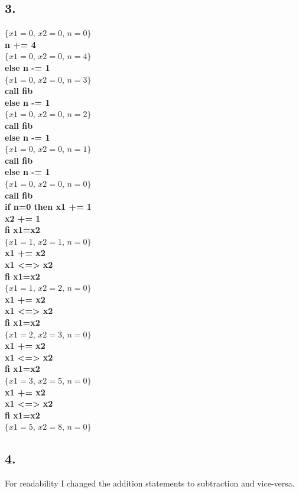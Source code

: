 \documentclass[12pt]{report}
\begin{document}
\subsection*{3.} 
$ \{x1=0$, $x2=0$, $n=0 \} $ \\
  \textbf{ n += 4 }\\
$ \{x1=0$, $x2=0$, $n=4 \} $ \\
  \textbf{else n -= 1} \\
$ \{x1=0$, $x2=0$, $n=3 \} $ \\
  \textbf{call fib} \\
 \textbf{else n -= 1} \\
$ \{x1=0$, $x2=0$, $n=2 \} $ \\
  \textbf{call fib} \\
  \textbf{else n -= 1} \\
$ \{x1=0$, $x2=0$, $n=1 \} $ \\
  \textbf{call fib} \\
  \textbf{else n -= 1} \\
$ \{x1=0$, $x2=0$, $n=0 \} $ \\
  \textbf{call fib} \\
  \textbf{if n=0 then x1 += 1} \\
  \textbf{x2 += 1} \\
  \textbf{fi x1=x2} \\
$ \{x1=1$, $x2=1$, $n=0 \} $ \\
  \textbf{x1 += x2} \\
  \textbf{x1 <=> x2} \\
  \textbf{fi x1=x2} \\
$ \{x1=1$, $x2=2$, $n=0 \} $ \\
  \textbf{x1 += x2} \\
  \textbf{x1 <=> x2} \\
  \textbf{fi x1=x2} \\
$ \{x1=2$, $x2=3$, $n=0 \} $ \\
  \textbf{x1 += x2} \\
  \textbf{x1 <=> x2} \\
  \textbf{fi x1=x2} \\
$ \{x1=3$, $x2=5$, $n=0 \} $ \\
  \textbf{x1 += x2} \\
  \textbf{x1 <=> x2} \\
  \textbf{fi x1=x2} \\
$ \{x1=5$, $x2=8$, $n=0 \} $ \\

\subsection*{4.}
For readability I changed the addition statements to subtraction and vice-versa.
\end{document}
